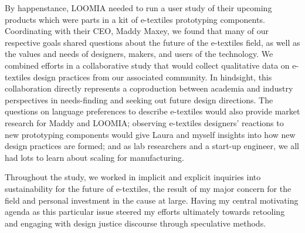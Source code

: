 
By happenstance, LOOMIA needed to run a user study of their upcoming products which were parts in a kit of e-textiles prototyping components. Coordinating with their CEO, Maddy Maxey, we found that many of our respective goals shared questions about the future of the e-textiles field, as well as the values and needs of designers, makers, and users of the technology. We combined efforts in a collaborative study that would collect qualitative data on e-textiles design practices from our associated community. In hindsight, this collaboration directly represents a coproduction between academia and industry perspectives in needs-finding and seeking out future design directions. The questions on language preferences to describe e-textiles would also provide market research for Maddy and LOOMIA; observing e-textiles designers' reactions to new prototyping components would give Laura and myself insights into how new design practices are formed; and as lab researchers and a start-up engineer, we all had lots to learn about scaling for manufacturing. 

Throughout the study, we worked in implicit and explicit inquiries into sustainability for the future of e-textiles, the result of my major concern for the field and personal investment in the cause at large. Having my central motivating agenda as this particular issue steered my efforts ultimately towards retooling and engaging with design justice discourse through speculative methods. 


